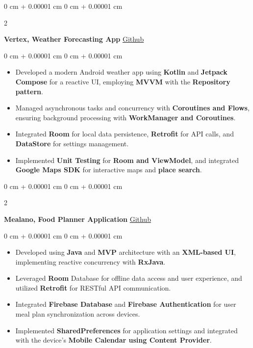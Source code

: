 \documentclass[10pt, letterpaper]{article}
\newenvironment{highlights}{
    \begin{itemize}[
        topsep=0.10 cm,
        parsep=0.10 cm,
        partopsep=0pt,
        itemsep=0pt,
        leftmargin=0 cm + 10pt
    ]
}{
    \end{itemize}
} %
\newenvironment{onecolentry}{
    \begin{adjustwidth}{
        0 cm + 0.00001 cm
    }{
        0 cm + 0.00001 cm
    }
}{
    \end{adjustwidth}
} %
\newenvironment{twocolentry}[2][]{
    \onecolentry
    \def\secondColumn{#2}
    \setcolumnwidth{\fill, 4.5 cm}
    \begin{paracol}{2}
}{
    \switchcolumn \raggedleft \secondColumn
    \end{paracol}
    \endonecolentry
} %
\begin{document}
        \vspace{0.2 cm}

        \begin{twocolentry}{
            \href{https://github.com/Boodyahmedhamdy/Vertex}{Github}
        }
            \textbf{Vertex, Weather Forecasting App}\end{twocolentry}

        \vspace{0.10 cm}
        \begin{onecolentry}
            \begin{highlights}
                \item Developed a modern Android weather app using \textbf{Kotlin} and \textbf{Jetpack Compose} for a reactive UI, employing \textbf{MVVM} with the \textbf{Repository pattern}.   
                \item Managed asynchronous tasks and concurrency with \textbf{Coroutines and Flows}, ensuring background processing with \textbf{WorkManager and Coroutines}.   
                \item Integrated \textbf{Room} for local data persistence, \textbf{Retrofit} for API calls, and \textbf{DataStore} for settings management.   
                \item Implemented \textbf{Unit Testing} for \textbf{Room and ViewModel}, and integrated \textbf{Google Maps SDK} for interactive maps and \textbf{place search}.   
            \end{highlights}
        \end{onecolentry}


        \vspace{0.2 cm}

        \begin{twocolentry}{
            \href{https://github.com/Boodyahmedhamdy/Mealano}{Github}
        }
            \textbf{Mealano, Food Planner Application}\end{twocolentry}

        \vspace{0.10 cm}
        \begin{onecolentry}
            \begin{highlights}
                \item Developed using \textbf{Java} and \textbf{MVP} architecture with an \textbf{XML-based UI}, implementing reactive concurrency with \textbf{RxJava}.
                \item Leveraged \textbf{Room} Database for offline data access and user experience, and utilized \textbf{Retrofit} for RESTful API communication.
                \item Integrated \textbf{Firebase Database} and \textbf{Firebase Authentication} for user meal plan synchronization across devices.
                \item Implemented \textbf{SharedPreferences} for application settings and integrated with the device's \textbf{Mobile Calendar using Content Provider}.
            \end{highlights}
        \end{onecolentry}
\end{document}
